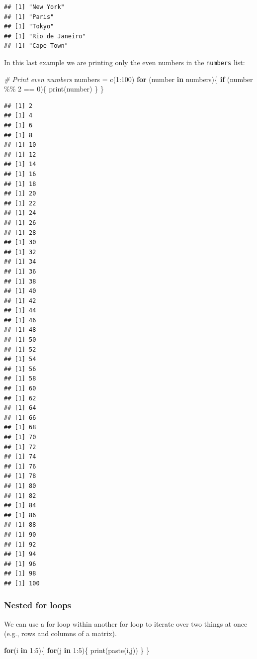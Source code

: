 \documentclass[
]{book}
\newenvironment{Shaded}{\begin{snugshade}}{\end{snugshade}}
\newcommand{\CommentTok}[1]{\textcolor[rgb]{0.56,0.35,0.01}{\textit{#1}}}
\newcommand{\ControlFlowTok}[1]{\textcolor[rgb]{0.13,0.29,0.53}{\textbf{#1}}}
\newcommand{\DecValTok}[1]{\textcolor[rgb]{0.00,0.00,0.81}{#1}}
\newcommand{\FunctionTok}[1]{\textcolor[rgb]{0.00,0.00,0.00}{#1}}
\newcommand{\NormalTok}[1]{#1}
\newcommand{\OtherTok}[1]{\textcolor[rgb]{0.56,0.35,0.01}{#1}}
\newcommand{\SpecialCharTok}[1]{\textcolor[rgb]{0.00,0.00,0.00}{#1}}
\theoremstyle{definition}
\theoremstyle{definition}
\theoremstyle{definition}
\theoremstyle{definition}
\theoremstyle{remark}
\begin{document}
\begin{verbatim}
## [1] "New York"
## [1] "Paris"
## [1] "Tokyo"
## [1] "Rio de Janeiro"
## [1] "Cape Town"
\end{verbatim}

In this last example we are printing only the even numbers in the \texttt{numbers} list:

\begin{Shaded}
\begin{Highlighting}[]
\CommentTok{\# Print even numbers}
\NormalTok{numbers }\OtherTok{=} \FunctionTok{c}\NormalTok{(}\DecValTok{1}\SpecialCharTok{:}\DecValTok{100}\NormalTok{)}
\ControlFlowTok{for}\NormalTok{ (number }\ControlFlowTok{in}\NormalTok{ numbers)\{}
    \ControlFlowTok{if}\NormalTok{ (number }\SpecialCharTok{\%\%} \DecValTok{2} \SpecialCharTok{==} \DecValTok{0}\NormalTok{)\{}
        \FunctionTok{print}\NormalTok{(number)}
\NormalTok{    \}}
\NormalTok{\}}
\end{Highlighting}
\end{Shaded}

\begin{verbatim}
## [1] 2
## [1] 4
## [1] 6
## [1] 8
## [1] 10
## [1] 12
## [1] 14
## [1] 16
## [1] 18
## [1] 20
## [1] 22
## [1] 24
## [1] 26
## [1] 28
## [1] 30
## [1] 32
## [1] 34
## [1] 36
## [1] 38
## [1] 40
## [1] 42
## [1] 44
## [1] 46
## [1] 48
## [1] 50
## [1] 52
## [1] 54
## [1] 56
## [1] 58
## [1] 60
## [1] 62
## [1] 64
## [1] 66
## [1] 68
## [1] 70
## [1] 72
## [1] 74
## [1] 76
## [1] 78
## [1] 80
## [1] 82
## [1] 84
## [1] 86
## [1] 88
## [1] 90
## [1] 92
## [1] 94
## [1] 96
## [1] 98
## [1] 100
\end{verbatim}

\hypertarget{nested-for-loops}{%
\subsubsection{Nested for loops}\label{nested-for-loops}}

We can use a for loop within another for loop to iterate over two things at once (e.g., rows and columns of a matrix).

\begin{Shaded}
\begin{Highlighting}[]
\ControlFlowTok{for}\NormalTok{(i }\ControlFlowTok{in} \DecValTok{1}\SpecialCharTok{:}\DecValTok{5}\NormalTok{)\{}
  \ControlFlowTok{for}\NormalTok{(j }\ControlFlowTok{in} \DecValTok{1}\SpecialCharTok{:}\DecValTok{5}\NormalTok{)\{}
    \FunctionTok{print}\NormalTok{(}\FunctionTok{paste}\NormalTok{(i,j))}
\NormalTok{  \}}
\NormalTok{\}}
\end{Highlighting}
\end{Shaded}
\end{document}
